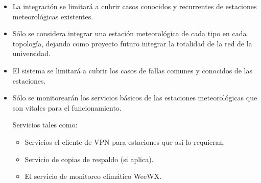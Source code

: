 \begin{itemize}

\item La integración se limitará a cubrir casos conocidos y recurrentes de estaciones meteorológicas existentes.
\item Sólo se considera integrar una estación meteorológica de cada tipo en cada topología, dejando como proyecto futuro integrar la totalidad de la red de la universidad.
\item El sistema se limitará a cubrir los casos de fallas comunes y conocidos de las estaciones.
\item Sólo se monitorearán los servicios básicos de las estaciones meteorológicas que son vitales para el funcionamiento.

Servicios tales como:

\begin{itemize}
   \item Servicios el cliente de VPN para estaciones que así lo requieran.
   \item Servicio de copias de respaldo (si aplica).
   \item El servicio de monitoreo climático WeeWX.
\end{itemize}

\end{itemize}
